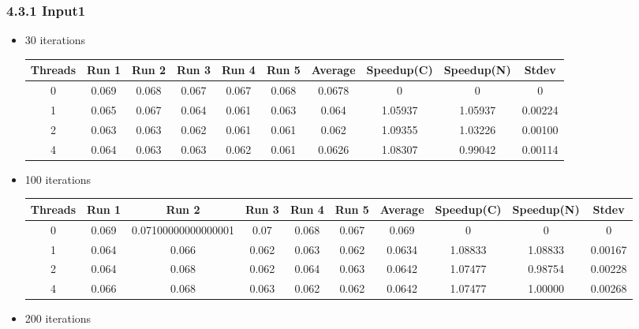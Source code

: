 \subsubsection*{4.3.1 Input1} 
 \begin{itemize}
\item 30 iterations
\begin{center}
 \begin{adjustbox}{width=\columnwidth, center} 
 \begin{tabular}{ | |c | c c c c c | c | c c | c | |} \hline 
 Threads & Run 1 & Run 2 & Run 3 & Run 4 & Run 5 & Average & Speedup(C) & Speedup(N) & Stdev \\ [0.5ex] 
 \hline 
 \hline 
0& 0.069 & 0.068 & 0.067 & 0.067 & 0.068 & 0.0678 & 0 & 0 & 0\\ 
 \hline
1& 0.065 & 0.067 & 0.064 & 0.061 & 0.063 & 0.064 & 1.05937 & 1.05937 & 0.00224\\ 
 \hline
2& 0.063 & 0.063 & 0.062 & 0.061 & 0.061 & 0.062 & 1.09355 & 1.03226 & 0.00100\\ 
 \hline
4& 0.064 & 0.063 & 0.063 & 0.062 & 0.061 & 0.0626 & 1.08307 & 0.99042 & 0.00114\\ 
 \hline
\end{tabular} 
 \end{adjustbox} 
 \end{center} 
\item 100 iterations
\begin{center}
 \begin{adjustbox}{width=\columnwidth, center} 
 \begin{tabular}{ | |c | c c c c c | c | c c | c | |} \hline 
 Threads & Run 1 & Run 2 & Run 3 & Run 4 & Run 5 & Average & Speedup(C) & Speedup(N) & Stdev \\ [0.5ex] 
 \hline 
 \hline 
0& 0.069 & 0.07100000000000001 & 0.07 & 0.068 & 0.067 & 0.069 & 0 & 0 & 0\\ 
 \hline
1& 0.064 & 0.066 & 0.062 & 0.063 & 0.062 & 0.0634 & 1.08833 & 1.08833 & 0.00167\\ 
 \hline
2& 0.064 & 0.068 & 0.062 & 0.064 & 0.063 & 0.0642 & 1.07477 & 0.98754 & 0.00228\\ 
 \hline
4& 0.066 & 0.068 & 0.063 & 0.062 & 0.062 & 0.0642 & 1.07477 & 1.00000 & 0.00268\\ 
 \hline
\end{tabular} 
 \end{adjustbox} 
 \end{center} 
\item 200 iterations

\end{itemize}
